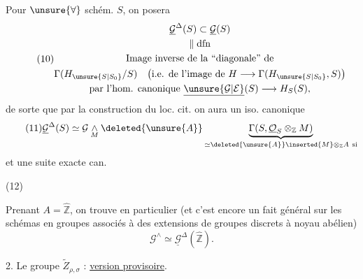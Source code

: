 Pour $\unsure{\forall}$ schém. $S$, on posera
\[
\tag{10}
\begin{gathered}
\underline{\mathcal G}^{\Delta}(S)\subset\underline{\mathcal G}(S)\\
\Vert\;\mathrm{dfn}\\
\text{Image inverse de la ``diagonale'' de}\\
\Gamma(H_{\unsure{S|S_0}}/S)
\quad\bigl(\text{i.e. de l'image de }H\longrightarrow\Gamma(H_{\unsure{S|S_0}},S)\bigr)\\
\text{par l'hom. canonique }\underline{\unsure{\mathcal G|\mathcal E}}(S)\longrightarrow H_S(S),
\end{gathered}
\]
de sorte que par la construction du loc. cit. on aura un iso. canonique
\[
\tag{11}
\underline{\mathcal G}^{\Delta}(S)\simeq
\mathcal G\underset{M}{\wedge}\deleted{\unsure{A}}
\underbrace{\Gamma(S,\underline{\mathcal O}_S\otimes_{\mathbb Z}M)}_{
\simeq\deleted{\unsure{A}}\inserted{M}\otimes_{\mathbb Z}A\ \text{si}}
\]
et une suite exacte can.

\begin{samepage}
(12)\quad{}
\end{samepage}


Prenant $A=\widehat{\mathbb Z}$, on trouve en particulier (et c'est encore un fait général sur les schémas en groupes associés à des extensions de groupes discrets à noyau abélien)
\[
\tag{13}
\mathcal G^{\wedge}\simeq\underline{\mathcal G}^{\Delta}(\widehat{\mathbb Z}).
\]


2. Le groupe $\widetilde Z_{\rho,\sigma}$ : \uline{version provisoire}.

